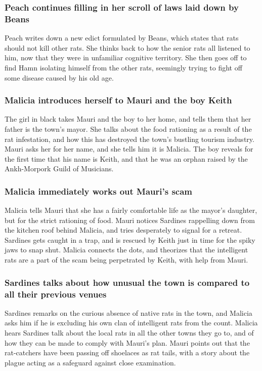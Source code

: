 \subsubsection{\Gls{Peach} continues filling in her scroll of laws laid down by \Gls{Beans}}
\Gls{Peach} writes down a new edict formulated by \Gls{Beans}, which states that rats should not
kill other rats. She thinks back to how the senior rats all listened to him, now that they were in
unfamiliar cognitive territory. She then goes off to find \Gls{Hamn} isolating himself from the
other rats, seemingly trying to fight off some disease caused by his old age.

\subsubsection{\Gls{Malicia} introduces herself to \Gls{Mauri} and the boy \Gls{Keith}}
The girl in black takes \Gls{Mauri} and the boy to her home, and tells them that her father is
the town's mayor. She talks about the food rationing as a result of the rat infestation, and how
this has destroyed the town's bustling tourism industry. \Gls{Mauri} asks her for her name, and
she tells him it is \Gls{Malicia}. The boy reveals for the first time that his name is \Gls{Keith},
and that he was an orphan raised by the Ankh-Morpork Guild of Musicians.

\subsubsection{\Gls{Malicia} immediately works out \Gls{Mauri}'s scam}
\Gls{Malicia} tells \Gls{Mauri} that she has a fairly comfortable life as the mayor's daughter, but
for the strict rationing of food. \Gls{Mauri} notices \Gls{Sardines} rappelling down from the
kitchen roof behind \Gls{Malicia}, and tries desperately to signal for a retreat. \Gls{Sardines}
gets caught in a trap, and is rescued by \Gls{Keith} just in time for the spiky jaws to snap shut.
\Gls{Malicia} connects the dots, and theorizes that the intelligent rats are a part of the scam
being perpetrated by \Gls{Keith}, with help from \Gls{Mauri}.

\subsubsection{\Gls{Sardines} talks about how unusual the town is compared to all their previous
    venues}
\Gls{Sardines} remarks on the curious absence of native rats in the town, and \Gls{Malicia} asks him
if he is excluding his own clan of intelligent rats from the count. \Gls{Malicia} hears
\Gls{Sardines} talk about the local rats in all the other towns they go to, and of how they can
be made to comply with \Gls{Mauri}'s plan. \Gls{Mauri} points out that the rat-catchers have been
passing off shoelaces as rat tails, with a story about the plague acting as a safeguard against
close examination.

